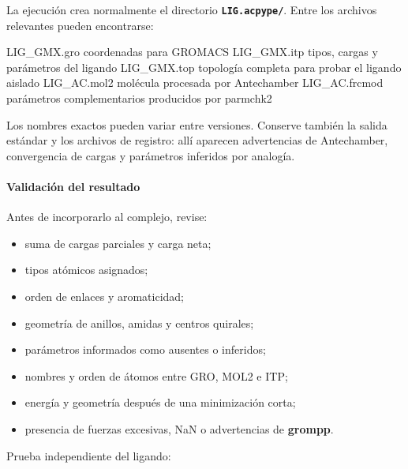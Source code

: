 \documentclass[
  spanish,
  11pt,
  a4paper]{article}
\newenvironment{Shaded}{\begin{snugshade}}{\end{snugshade}}
\newcommand{\NormalTok}[1]{#1}
\providecommand{\tightlist}{%
  \setlength{\itemsep}{0pt}\setlength{\parskip}{0pt}}
\begin{document}
La ejecución crea normalmente el directorio
\textbf{\texttt{LIG.acpype/}}. Entre los archivos relevantes pueden
encontrarse:

\begin{Shaded}
\begin{Highlighting}[]
\NormalTok{LIG\_GMX.gro       coordenadas para GROMACS}
\NormalTok{LIG\_GMX.itp       tipos, cargas y parámetros del ligando}
\NormalTok{LIG\_GMX.top       topología completa para probar el ligando aislado}
\NormalTok{LIG\_AC.mol2       molécula procesada por Antechamber}
\NormalTok{LIG\_AC.frcmod     parámetros complementarios producidos por parmchk2}
\end{Highlighting}
\end{Shaded}

Los nombres exactos pueden variar entre versiones. Conserve también la
salida estándar y los archivos de registro: allí aparecen advertencias
de Antechamber, convergencia de cargas y parámetros inferidos por
analogía.

\paragraph{Validación del resultado}\label{validaciuxf3n-del-resultado}

Antes de incorporarlo al complejo, revise:

\begin{itemize}
\tightlist
\item
  suma de cargas parciales y carga neta;
\item
  tipos atómicos asignados;
\item
  orden de enlaces y aromaticidad;
\item
  geometría de anillos, amidas y centros quirales;
\item
  parámetros informados como ausentes o inferidos;
\item
  nombres y orden de átomos entre GRO, MOL2 e ITP;
\item
  energía y geometría después de una minimización corta;
\item
  presencia de fuerzas excesivas, NaN o advertencias de \textbf{grompp}.
\end{itemize}

Prueba independiente del ligando:
\end{document}
